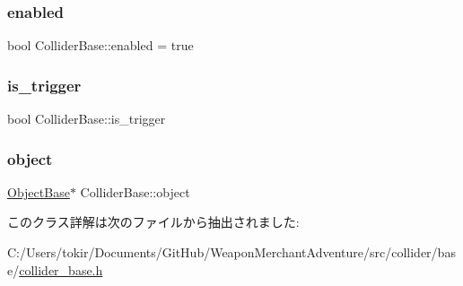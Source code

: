 \mbox{\label{class_collider_base_a812053f247dc6357357bdf9353dded77}} 
\subsubsection{\texorpdfstring{enabled}{enabled}}
{\footnotesize\ttfamily bool Collider\+Base\+::enabled = true}

\mbox{\label{class_collider_base_a8e2383d9422880103aa5309a6dfcef48}} 
\subsubsection{\texorpdfstring{is\+\_\+trigger}{is\_trigger}}
{\footnotesize\ttfamily bool Collider\+Base\+::is\+\_\+trigger}

\mbox{\label{class_collider_base_a63adac6a75877857abe9ff2cf4274157}} 
\subsubsection{\texorpdfstring{object}{object}}
{\footnotesize\ttfamily \mbox{\hyperlink{class_object_base}{Object\+Base}}$\ast$ Collider\+Base\+::object}



このクラス詳解は次のファイルから抽出されました\+:\begin{DoxyCompactItemize}
\item 
C\+:/\+Users/tokir/\+Documents/\+Git\+Hub/\+Weapon\+Merchant\+Adventure/src/collider/base/\mbox{\hyperlink{collider__base_8h}{collider\+\_\+base.\+h}}\end{DoxyCompactItemize}
